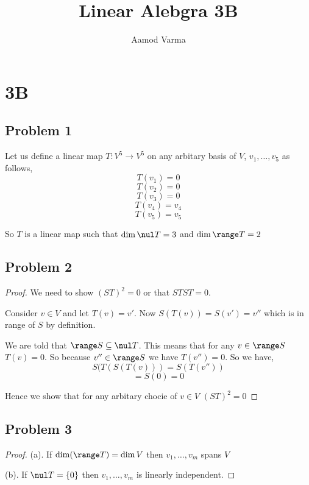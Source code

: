 \documentclass[a4paper]{report}
\title{Linear Alebgra 3B}
\author{Aamod Varma}
\begin{document}
\maketitle
\date{}


\section*{3B}
\subsection*{Problem 1}
Let us define a linear  map $T: V^{5} \rightarrow V^{5}$ on any arbitary basis of $V$, $v_1,\dots,v_5$ as follows, 
$$ T(v_1) = 0 $$ 
$$ T(v_2) = 0 $$ 
$$ T(v_3) = 0 $$ 
$$ T(v_4) = v_4 $$ 
$$ T(v_5) = v_5 $$ 

So $T$ is a linear map such that $\dim \nul T = 3$ and $\dim \range T = 2$


\subsection*{Problem 2}
\begin{proof}
    We need to show $(ST)^2 = 0$ or that $STST = 0$.

    Consider $v \in V$ and let  $T(v) = v'$. Now $S(T(v)) = S(v') = v''$ which is in range of $S$ by definition.

    We are told that $\range S \subseteq \nul T$. This means that for any  $v \in \range S$ $T(v) = 0$. So because $v'' \in \range S$ we have $T(v'') = 0$. So we have,  
    $$ S(T(S(T(v))) = S(T(v'')) $$ 
    $$ = S(0) = 0 $$ 

    Hence we  show that for any arbitary chocie of $v \in V$ $(ST)^2 = 0$
\end{proof}


\subsection*{Problem 3}
\begin{proof}
    (a). If $\dim(\range T) = \dim V$ then $v_1,\dots,v_m$ spans $V$

    (b). If $\nul T = \{0\}$ then  $v_1,\dots,v_m$ is linearly independent.
\end{proof}
\end{document}
